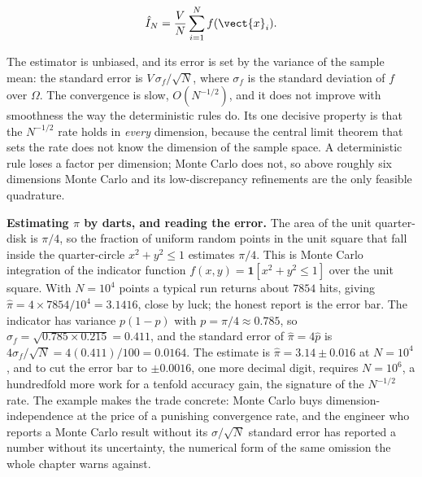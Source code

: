 \[
\hat{I}_{N} = \frac{V}{N}\sum_{i=1}^{N} f(\vect{x}_{i}).
\]

The estimator is unbiased, and its error is set by the variance of the sample
mean: the standard error is $V\,\sigma_{f}/\sqrt{N}$, where $\sigma_{f}$ is the
standard deviation of $f$ over $\Omega$. The convergence is slow, $O(N^{-1/2})$,
and it does not improve with smoothness the way the deterministic rules do. Its
one decisive property is that the $N^{-1/2}$ rate holds in \emph{every}
dimension, because the central limit theorem that sets the rate does not know
the dimension of the sample space. A deterministic rule loses a factor per
dimension; Monte Carlo does not, so above roughly six dimensions Monte Carlo
and its low-discrepancy refinements are the only feasible quadrature.

\begin{example}
\textbf{Estimating $\pi$ by darts, and reading the error.} The area of the
unit quarter-disk is $\pi/4$, so the fraction of uniform random points in the
unit square that fall inside the quarter-circle $x^{2} + y^{2} \leq 1$
estimates $\pi/4$. This is Monte Carlo integration of the indicator function
$f(x, y) = \mathbf{1}[x^{2} + y^{2} \leq 1]$ over the unit square. With $N =
10^{4}$ points a typical run returns about $7854$ hits, giving $\hat\pi = 4
\times 7854/10^{4} = 3.1416$, close by luck; the honest report is the error
bar. The indicator has variance $p(1 - p)$ with $p = \pi/4 \approx 0.785$, so
$\sigma_{f} = \sqrt{0.785 \times 0.215} = 0.411$, and the standard error of
$\hat\pi = 4\hat{p}$ is $4\sigma_{f}/\sqrt{N} = 4(0.411)/100 = 0.0164$. The
estimate is $\hat\pi = 3.14 \pm 0.016$ at $N = 10^{4}$, and to cut the error
bar to $\pm 0.0016$, one more decimal digit, requires $N = 10^{6}$, a
hundredfold more work for a tenfold accuracy gain, the signature of the
$N^{-1/2}$ rate. The example makes the trade concrete: Monte Carlo buys
dimension-independence at the price of a punishing convergence rate, and the
engineer who reports a Monte Carlo result without its $\sigma/\sqrt{N}$
standard error has reported a number without its uncertainty, the numerical
form of the same omission the whole chapter warns against.
\end{example}



